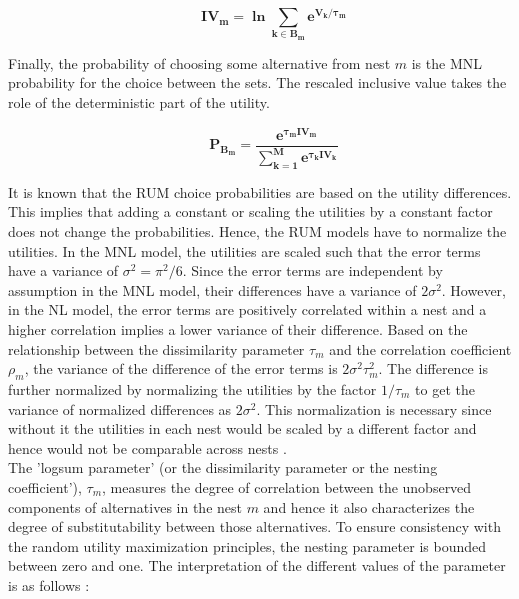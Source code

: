 \documentclass[a4paper,11pt]{article}
\begin{document}
    \begin{equation*}
        \qquad \mathbf{IV_{m} = \ln \sum_{k \in B_{m}}e^{V_{k}/\tau_{m}}}
    \end{equation*}

    Finally, the probability of choosing some alternative from nest $m$ is the MNL probability for the choice between the sets. The rescaled inclusive value takes the role of the deterministic part of the utility.

    \begin{equation*}
        \qquad \mathbf{P_{B_{m}} = \dfrac{e^{\tau_{m}IV_{m}}}{\sum_{k=1}^{M}e^{\tau_{k}IV_{k}}}}
    \end{equation*}

    It is known that the RUM choice probabilities are based on the utility differences. This implies that adding a constant or scaling the utilities by a constant factor does not change the probabilities. Hence, the RUM models have to normalize the utilities. In the MNL model, the utilities are scaled such that the error terms have a variance of $\sigma^{2} = \pi^{2}/6$. Since the error terms are independent by assumption in the MNL model, their differences have a variance of $2\sigma^{2}$. However, in the NL model, the error terms are positively correlated within a nest and a higher correlation implies a lower variance of their difference. Based on the relationship between the dissimilarity parameter $\tau_{m}$ and the correlation coefficient $\rho_{m}$, the variance of the difference of the error terms is $2\sigma^{2}\tau_{m}^{2}$. The difference is further normalized by normalizing the utilities by the factor $1/\tau_{m}$ to get the variance of normalized differences as $2\sigma^{2}$. This normalization is necessary since without it the utilities in each nest would be scaled by a different factor and hence would not be comparable across nests \cite{Heiss}.\\

    The 'logsum parameter' (or the dissimilarity parameter or the nesting coefficient'), $\tau_{m}$, measures the degree of correlation between the unobserved components of alternatives in the nest $m$ and hence it also characterizes the degree of substitutability between those alternatives. To ensure consistency with the random utility maximization principles, the nesting parameter is bounded between zero and one. The interpretation of the different values of the parameter is as follows \cite{Koppelman&Bhat}:
\end{document}

